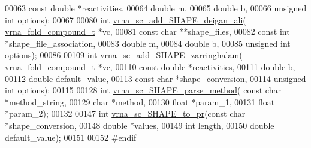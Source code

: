 \begin{DoxyCode}
00063                               \textcolor{keyword}{const} \textcolor{keywordtype}{double} *reactivities,
00064                               \textcolor{keywordtype}{double} m,
00065                               \textcolor{keywordtype}{double} b,
00066                               \textcolor{keywordtype}{unsigned} \textcolor{keywordtype}{int} options);
00067 
00080 \textcolor{keywordtype}{int} \mbox{\hyperlink{group___s_h_a_p_e__reactivities_ga04ba85da63d8c793bb8001d1e6f800ba}{vrna\_sc\_add\_SHAPE\_deigan\_ali}}( 
      \mbox{\hyperlink{group__fold__compound_structvrna__fc__s}{vrna\_fold\_compound\_t}} *vc,
00081                                   \textcolor{keyword}{const} \textcolor{keywordtype}{char} **shape\_files,
00082                                   \textcolor{keyword}{const} \textcolor{keywordtype}{int} *shape\_file\_association,
00083                                   \textcolor{keywordtype}{double} m,
00084                                   \textcolor{keywordtype}{double} b,
00085                                   \textcolor{keywordtype}{unsigned} \textcolor{keywordtype}{int} options);
00086 
00109 \textcolor{keywordtype}{int} \mbox{\hyperlink{group___s_h_a_p_e__reactivities_gaf3c65a045060aef5c4e41693d30af58c}{vrna\_sc\_add\_SHAPE\_zarringhalam}}( 
      \mbox{\hyperlink{group__fold__compound_structvrna__fc__s}{vrna\_fold\_compound\_t}} *vc,
00110                                     \textcolor{keyword}{const} \textcolor{keywordtype}{double} *reactivities,
00111                                     \textcolor{keywordtype}{double} b,
00112                                     \textcolor{keywordtype}{double} default\_value,
00113                                     \textcolor{keyword}{const} \textcolor{keywordtype}{char} *shape\_conversion,
00114                                     \textcolor{keywordtype}{unsigned} \textcolor{keywordtype}{int} options);
00115 
00128 \textcolor{keywordtype}{int} \mbox{\hyperlink{constraints___s_h_a_p_e_8h_a71b84eb0dd69e5c256f4ecf8f78cf314}{vrna\_sc\_SHAPE\_parse\_method}}( \textcolor{keyword}{const} \textcolor{keywordtype}{char} *method\_string,
00129                                 \textcolor{keywordtype}{char} *method,
00130                                 \textcolor{keywordtype}{float} *param\_1,
00131                                 \textcolor{keywordtype}{float} *param\_2);
00132 
00147 \textcolor{keywordtype}{int} \mbox{\hyperlink{group___s_h_a_p_e__reactivities_ga67675b3ed48744489a3bcfa4174197cb}{vrna\_sc\_SHAPE\_to\_pr}}(\textcolor{keyword}{const} \textcolor{keywordtype}{char} *shape\_conversion,
00148                         \textcolor{keywordtype}{double} *values,
00149                         \textcolor{keywordtype}{int} length,
00150                         \textcolor{keywordtype}{double} default\_value);
00151 
00152 \textcolor{preprocessor}{#endif}
\end{DoxyCode}
